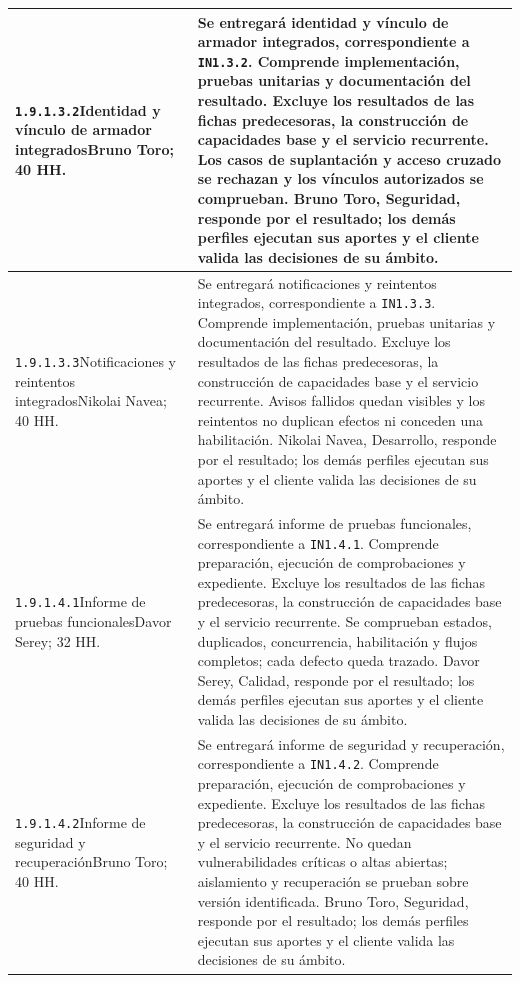 \begin{longtable}{L{52mm}L{91mm}}
\texttt{1.\allowbreak{}9.\allowbreak{}1.\allowbreak{}3.\allowbreak{}2}\newline Identidad y vínculo de armador integrados\newline Bruno Toro; 40 HH. & Se entregará identidad y vínculo de armador integrados, correspondiente a \texttt{IN1.3.2}. Comprende implementación, pruebas unitarias y documentación del resultado. Excluye los resultados de las fichas predecesoras, la construcción de capacidades base y el servicio recurrente.  Los casos de suplantación y acceso cruzado se rechazan y los vínculos autorizados se comprueban. Bruno Toro, Seguridad, responde por el resultado; los demás perfiles ejecutan sus aportes y el cliente valida las decisiones de su ámbito.\\\hline
\texttt{1.\allowbreak{}9.\allowbreak{}1.\allowbreak{}3.\allowbreak{}3}\newline Notificaciones y reintentos integrados\newline Nikolai Navea; 40 HH. & Se entregará notificaciones y reintentos integrados, correspondiente a \texttt{IN1.3.3}. Comprende implementación, pruebas unitarias y documentación del resultado. Excluye los resultados de las fichas predecesoras, la construcción de capacidades base y el servicio recurrente.  Avisos fallidos quedan visibles y los reintentos no duplican efectos ni conceden una habilitación. Nikolai Navea, Desarrollo, responde por el resultado; los demás perfiles ejecutan sus aportes y el cliente valida las decisiones de su ámbito.\\\hline
\texttt{1.\allowbreak{}9.\allowbreak{}1.\allowbreak{}4.\allowbreak{}1}\newline Informe de pruebas funcionales\newline Davor Serey; 32 HH. & Se entregará informe de pruebas funcionales, correspondiente a \texttt{IN1.4.1}. Comprende preparación, ejecución de comprobaciones y expediente. Excluye los resultados de las fichas predecesoras, la construcción de capacidades base y el servicio recurrente.  Se comprueban estados, duplicados, concurrencia, habilitación y flujos completos; cada defecto queda trazado. Davor Serey, Calidad, responde por el resultado; los demás perfiles ejecutan sus aportes y el cliente valida las decisiones de su ámbito.\\\hline
\texttt{1.\allowbreak{}9.\allowbreak{}1.\allowbreak{}4.\allowbreak{}2}\newline Informe de seguridad y recuperación\newline Bruno Toro; 40 HH. & Se entregará informe de seguridad y recuperación, correspondiente a \texttt{IN1.4.2}. Comprende preparación, ejecución de comprobaciones y expediente. Excluye los resultados de las fichas predecesoras, la construcción de capacidades base y el servicio recurrente.  No quedan vulnerabilidades críticas o altas abiertas; aislamiento y recuperación se prueban sobre versión identificada. Bruno Toro, Seguridad, responde por el resultado; los demás perfiles ejecutan sus aportes y el cliente valida las decisiones de su ámbito.\\\hline

\end{longtable}
